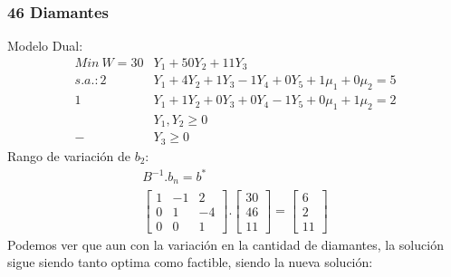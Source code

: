 \begin{homeworkProblem}
\subsubsection{46 Diamantes}
Modelo Dual:
\begin{align*}
    Min\ W = 30&Y_1 + 50Y_2 + 11Y_3 \\
    s.a.: 2&Y_1 + 4Y_2 + 1Y_3 - 1Y_4 + 0Y_5 + 1\mu_1 + 0\mu_2 = 5 \\ 
     1&Y_1 + 1Y_2 + 0Y_3 + 0Y_4 - 1Y_5 + 0\mu_1 + 1\mu_2 = 2 \\ 
     &Y_1,Y_2 \ge 0 \\ -&Y_3 \ge 0
\end{align*}
Rango de variación de $b_2$:
\begin{align*}
    B^{-1}.b_n = b^{*} \\
    \begin{bmatrix}
        1 & -1 & 2 \\
        0 & 1 & -4 \\
        0 & 0 & 1 
    \end{bmatrix}.
    \begin{bmatrix}
        30 \\
        46 \\
        11
    \end{bmatrix}=
    \begin{bmatrix}
        6 \\
        2\\
        11
    \end{bmatrix}
\end{align*}
Podemos ver que aun con la variación en la cantidad de diamantes, la solución sigue siendo tanto optima como factible, siendo la nueva solución:


\end{homeworkProblem}
